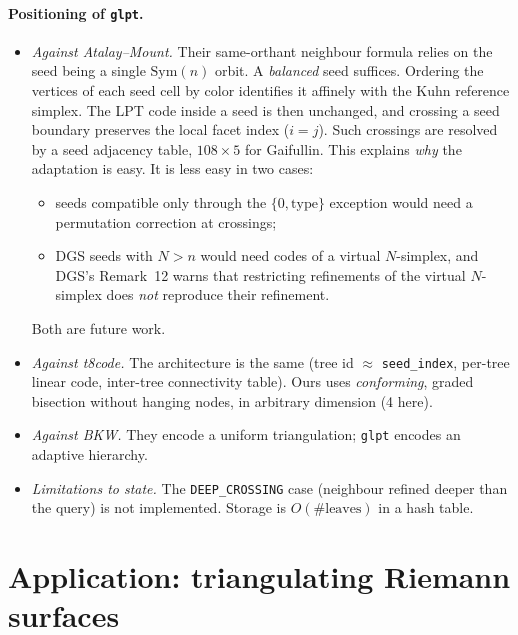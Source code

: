 \documentclass[11pt]{article}
\newcommand{\type}{\mathrm{type}}
\begin{document}
\paragraph{Positioning of \texttt{glpt}.}
\begin{itemize}[leftmargin=*,itemsep=3pt]
\item \emph{Against Atalay--Mount.} Their same-orthant neighbour formula
  relies on the seed being a single $\mathrm{Sym}(n)$ orbit. A \emph{balanced}
  seed suffices. Ordering the vertices of each seed cell by color identifies
  it affinely with the Kuhn reference simplex. The LPT code inside a seed is
  then unchanged, and crossing a seed boundary preserves the local facet
  index ($i=j$). Such crossings are resolved by a seed adjacency table,
  $108\times5$ for Gaifullin. This explains \emph{why} the adaptation is
  easy. It is less easy in two cases:
  \begin{itemize}[itemsep=0pt]
  \item seeds compatible only through the $\{0,\type\}$ exception would need
    a permutation correction at crossings;
  \item DGS seeds with $N>n$ would need codes of a virtual $N$-simplex, and
    DGS's Remark~12 warns that restricting refinements of the virtual
    $N$-simplex does \emph{not} reproduce their refinement.
  \end{itemize}
  Both are future work.
\item \emph{Against t8code.} The architecture is the same (tree id
  $\approx$ \texttt{seed\_index}, per-tree linear code, inter-tree
  connectivity table). Ours uses \emph{conforming}, graded bisection
  without hanging nodes, in arbitrary dimension (4 here).
\item \emph{Against BKW.} They encode a uniform triangulation; \texttt{glpt}
  encodes an adaptive hierarchy.
\item \emph{Limitations to state.} The \texttt{DEEP\_CROSSING} case
  (neighbour refined deeper than the query) is not implemented. Storage is
  $O(\#\text{leaves})$ in a hash table.
\end{itemize}

\section{Application: triangulating Riemann surfaces}
\label{sec:riemann}
\end{document}
